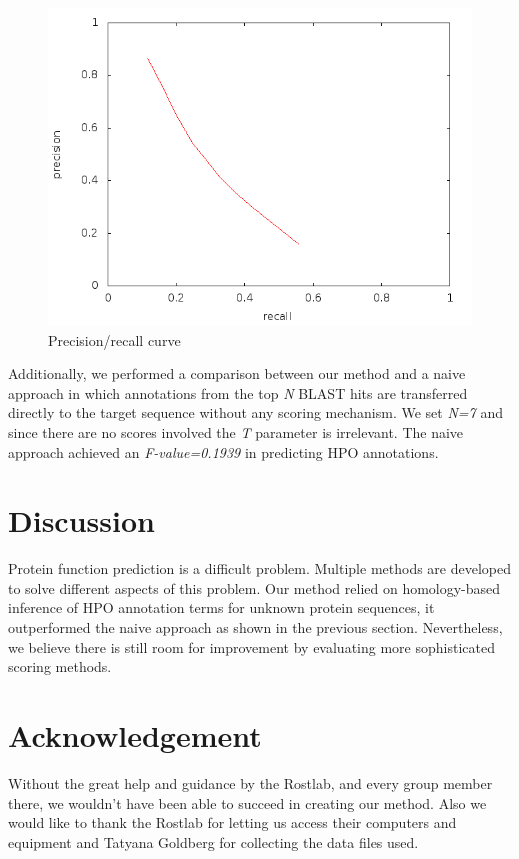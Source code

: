 \documentclass{bioinfo}
\begin{document}
\begin{figure}[!tpb]
\centerline{\includegraphics[scale=0.4]{bilder/image-4.png}}
\caption{Precision/recall curve}
\label{precrec}
\end{figure}

Additionally, we performed a comparison between our method and a naive approach in which annotations from the top \textit{N} BLAST hits are transferred directly to the target sequence without any scoring mechanism. We set \textit{N=7} and since there are no scores involved the \textit{T} parameter is irrelevant. The naive approach achieved an \textit{F-value=0.1939} in predicting HPO annotations.

\section{Discussion}

Protein function prediction is a difficult problem. Multiple methods are developed to solve different aspects of this problem. Our method relied on homology-based inference of HPO annotation terms for unknown protein sequences, it outperformed the naive approach as shown in the previous section. Nevertheless, we believe there is still room for improvement by evaluating more sophisticated scoring methods.

\section*{Acknowledgement}
Without the great help and guidance by the Rostlab, and every group member there, we wouldn't have been able to succeed in creating our method. Also we would like to thank the Rostlab for letting us access their computers and equipment and Tatyana Goldberg for collecting the data files used.
\end{document}
